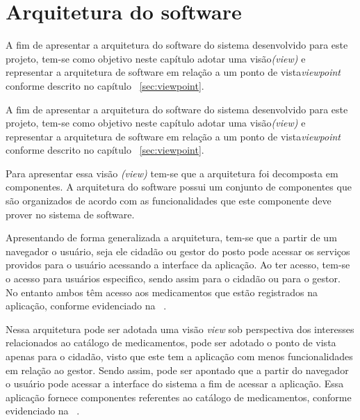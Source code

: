 \section{Arquitetura do software}
\label{sec:arquitetura}

A fim de apresentar a arquitetura do software do sistema desenvolvido para este projeto, tem-se como objetivo neste capítulo adotar uma visão\emph{(view)} e representar a arquitetura de software em relação a um ponto de vista\emph{viewpoint} conforme descrito no capítulo ~\ref{sec:viewpoint}.


A fim de apresentar a arquitetura do software do sistema desenvolvido para este projeto, tem-se como objetivo neste capítulo adotar uma visão\emph{(view)} e representar a arquitetura de software em relação a um ponto de vista\emph{viewpoint} conforme descrito no capítulo ~\ref{sec:viewpoint}.

Para apresentar essa visão \emph{(view)} tem-se que a arquitetura foi decomposta em componentes. A arquitetura do software possui um conjunto de componentes que são organizados de acordo com as funcionalidades que este componente deve prover no sistema de software. 

%

Apresentando de forma generalizada a arquitetura, tem-se que a partir de um navegador o usuário, seja ele cidadão ou gestor do posto pode acessar os serviços providos para o usuário acessando a interface da aplicação. Ao ter acesso, tem-se o acesso para usuários especifico, sendo assim para o cidadão ou para o gestor. No entanto ambos têm acesso aos medicamentos que estão registrados na aplicação, conforme evidenciado na  ~.

Nessa arquitetura pode ser adotada uma visão \emph{view} sob perspectiva dos interesses relacionados ao catálogo de medicamentos, pode ser adotado o ponto de vista apenas para o cidadão, visto que este tem a aplicação com menos funcionalidades em relação ao gestor. Sendo assim, pode ser apontado que a partir do navegador o usuário pode acessar a interface do sistema a fim de acessar a aplicação. Essa aplicação fornece componentes referentes ao catálogo de medicamentos, conforme evidenciado na ~.


%

